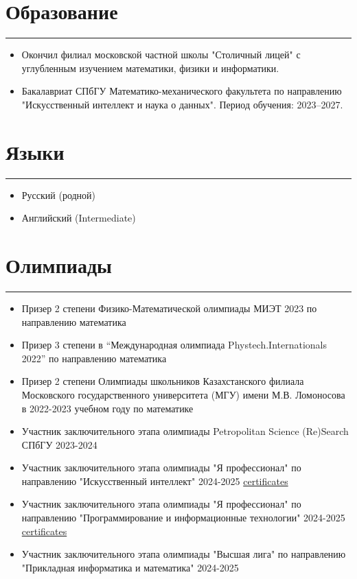 \documentclass[a4paper,14pt]{article}
\begin{document}
\section*{Образование}
\hrule
\vspace{0.5em}
\begin{itemize}
    \item Окончил филиал московской частной школы "Столичный лицей" с углубленным изучением математики, физики и информатики.
    \item Бакалавриат СПбГУ Математико-механического факультета по направлению "Искусственный интеллект и наука о данных". Период обучения: 2023–2027.
\end{itemize}

\section*{Языки}
\hrule
\vspace{0.5em}
\begin{itemize}
    \item Русский (родной)
    \item Английский (Intermediate)
\end{itemize}

\section*{Олимпиады}
\hrule
\vspace{0.5em}
\begin{itemize}
    \item Призер 2 степени  Физико-Математической олимпиады МИЭТ 2023 по направлению математика
    \item Призер 3 степени в “Международная олимпиада Phystech.Internationals 2022” по направлению математика
    \item Призер 2 степени Олимпиады школьников Казахстанского филиала Московского государственного университета (МГУ) имени М.В. Ломоносова в 2022-2023 учебном году по математике
    \item Участник заключительного этапа олимпиады Petropolitan Science (Re)Search СПбГУ 2023-2024
    \item Участник заключительного этапа олимпиады "Я профессионал" по направлению "Искусственный интеллект" 2024-2025 \href{https://github.com/Denigmma/Practice_LogBook/blob/main/Yandex/Я%20профессионал%20(olimp)/2024-2025/certificates/ИИ(приглашение%20на%20заключительный%20этап).pdf}{certificates}
    \item Участник заключительного этапа олимпиады "Я профессионал" по направлению "Программирование и информационные технологии" 2024-2025 \href{https://github.com/Denigmma/Practice_LogBook/blob/main/Yandex/Я%20профессионал%20(olimp)/2024-2025/certificates/ПрогИнфТех(приглашение%20на%20заключительный%20этап).pdf}{certificates}
    \item Участник заключительного этапа олимпиады "Высшая лига" по направлению "Прикладная информатика и математика" 2024-2025
\end{itemize}
\end{document}
